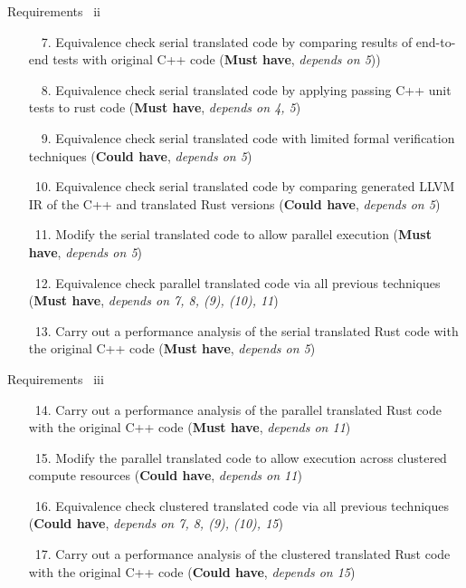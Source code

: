 \documentclass[10pt,aspectratio=169]{beamer}
\newcommand{\cmark}{\ding{51}}
\newcommand{\xmark}{\ding{55}}
\newcommand{\done}{\rlap{$\square$}{\raisebox{2pt}{\large\hspace{1pt}\textcolor{green}{\cmark}}}\hspace{-2.5pt}}
\newcommand{\wontfix}{\rlap{$\square$}{\large\hspace{1pt}\textcolor{red}{\xmark}}}
\newcommand{\partialdone}{\rlap{$\square$}{\raisebox{2pt}{\large\hspace{1pt}\textcolor{orange}{\cmark}}}\hspace{-2.5pt}}
\begin{document}
\begin{frame}{Requirements \ ii}
    \begin{enumerate}
        \item[\done\ \ 7.]
          Equivalence check serial translated code by comparing results of end-to-end tests with original C++ code
          (\textbf{Must have}, \textit{depends on 5}))
        \item[\done\ \ 8.]
          Equivalence check serial translated code by applying passing C++ unit tests to rust code
          (\textbf{Must have}, \textit{depends on 4, 5})
        \item[\wontfix\ \ 9.]
          Equivalence check serial translated code with limited formal verification techniques
          (\textbf{Could have}, \textit{depends on 5})
        \item[\partialdone\ 10.]
          Equivalence check serial translated code by comparing generated LLVM IR of the C++ and translated Rust versions
          (\textbf{Could have}, \textit{depends on 5})
        \item[\done\ 11.]
          Modify the serial translated code to allow parallel execution
          (\textbf{Must have}, \textit{depends on 5})
        \item[\done\ 12.]
          Equivalence check parallel translated code via all previous techniques
          (\textbf{Must have}, \textit{depends on 7, 8, (9), (10), 11})
        \item[\done\ 13.]
          Carry out a performance analysis of the serial translated Rust code with the original C++ code
          (\textbf{Must have}, \textit{depends on 5})
    \end{enumerate}
\end{frame}

\begin{frame}{Requirements \ iii}
    \begin{enumerate}
        \item[\done\ 14.]
          Carry out a performance analysis of the parallel translated Rust code with the original C++ code
          (\textbf{Must have}, \textit{depends on 11})
        \item[\done\ 15.]
          Modify the parallel translated code to allow execution across clustered compute resources
          (\textbf{Could have}, \textit{depends on 11})
        \item[\done\ 16.]
          Equivalence check clustered translated code via all previous techniques
          (\textbf{Could have}, \textit{depends on 7, 8, (9), (10), 15})
        \item[\done\ 17.]
          Carry out a performance analysis of the clustered translated Rust code with the original C++ code
          (\textbf{Could have}, \textit{depends on 15})
    \end{enumerate}
\end{frame}
\end{document}
